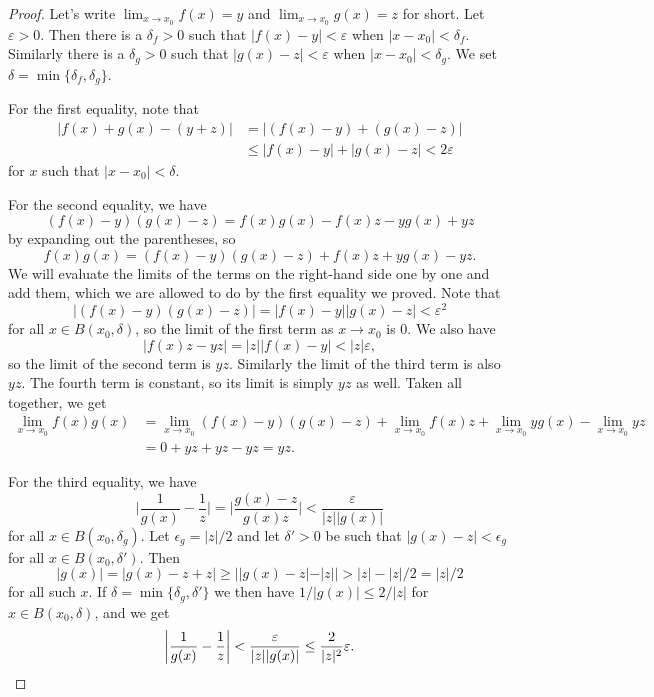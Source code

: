 \documentclass[11pt]{article}
\theoremstyle{definition}
\def\eps{\varepsilon}
\begin{document}
\begin{proof}
Let's write $\lim_{x \to x_0} f(x) = y$ and $\lim_{x \to x_0} g(x) = z$ for short.
Let $\eps > 0$.
Then there is a $\delta_f > 0$ such that $|f(x) - y| < \eps$ when $|x - x_0| <
\delta_f$.
Similarly there is a $\delta_g > 0$ such that $|g(x) - z| < \eps$ when
$|x - x_0| < \delta_g$.
We set $\delta = \min\{\delta_f, \delta_g\}$.

For the first equality, note that
\begin{align*}
|f(x) + g(x) - (y + z)|
&= |(f(x) - y) + (g(x) - z)|
\\
&\leq |f(x) - y| + |g(x) - z|
< 2\eps
\end{align*}
for $x$ such that $|x - x_0| < \delta$.

For the second equality, we have
\[
(f(x) - y)(g(x) - z)
= f(x) g(x) - f(x) z - y g(x) + yz
\]
by expanding out the parentheses, so
\[
f(x) g(x)
= (f(x) - y)(g(x) - z) + f(x) z + y g(x) - yz.
\]
We will evaluate the limits of the terms on the right-hand side one by one and
add them, which we are allowed to do by the first equality we proved.
Note that
\[
|(f(x) - y)(g(x) - z)|
= |f(x) - y| |g(x) - z|
< \eps^2
\]
for all $x \in B(x_0, \delta)$, so the limit of the first term as $x \to x_0$
is $0$. We also have
\[
|f(x) z - yz| = |z| |f(x) - y| < |z| \eps,
\]
so the limit of the second term is $yz$.
Similarly the limit of the third term is also $yz$.
The fourth term is constant, so its limit is simply $yz$ as well.
Taken all together, we get
\begin{align*}
\lim_{x \to x_0} f(x) g(x)
&= \lim_{x \to x_0} (f(x) {-} y)(g(x) {-} z) 
{+}\!\! \lim_{x \to x_0} f(x) z 
{+}\!\! \lim_{x \to x_0} y g(x) 
{-}\!\! \lim_{x \to x_0} yz
\\
&= 0 + yz + yz - yz = yz.
\end{align*}

For the third equality, we have
\[
\biggl|\frac{1}{g(x)} - \frac{1}{z}\biggr|
= \biggl|\frac{g(x) - z}{g(x) z}\biggr|
< \frac{\eps}{|z| |g(x)|}
\]
for all $x \in B(x_0, \delta_g)$.
Let $\epsilon_g = |z|/2$ and let $\delta' > 0$ be such that
$|g(x) - z| < \epsilon_g$ for all $x \in B(x_0, \delta')$.
Then
\[
|g(x)| = |g(x) - z + z| \geq ||g(x) - z| - |z|| > |z| - |z|/2 = |z|/2
\]
for all such $x$.
If $\delta = \min \{\delta_g, \delta' \}$ we then have $1/|g(x)| \leq 2/|z|$
for $x \in B(x_0, \delta)$, and we get
\[
\biggl|\frac{1}{g(x)} - \frac{1}{z}\biggr|
< \frac{\eps}{|z| |g(x)|}
\leq \frac{2}{|z|^2} \eps.
\qedhere
\]
\end{proof}
\end{document}
